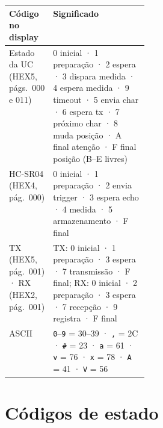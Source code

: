 \documentclass[9pt,a4paper]{extarticle}
\newcommand{\s}[1]{\texttt{#1}}          %
\begin{document}
\begin{center}
\end{center}

\begin{tabularx}{\linewidth}{@{}>{\raggedright\arraybackslash}p{0.27\linewidth} Y@{}}
\toprule
Código no display & Significado \\
\midrule
Estado da UC (HEX5, págs.\ 000 e 011) & 0 inicial · 1 preparação · 2 espera · 3 dispara medida · 4 espera medida · 9 timeout · 5 envia char · 6 espera tx · 7 próximo char · 8 muda posição · A final atenção · F final posição (B--E livres) \\
HC-SR04 (HEX4, pág.\ 000) & 0 inicial · 1 preparação · 2 envia trigger · 3 espera echo · 4 medida · 5 armazenamento · F final \\
TX (HEX5, pág.\ 001) · RX (HEX2, pág.\ 001) & TX: 0 inicial · 1 preparação · 3 espera · 7 transmissão · F final; RX: 0 inicial · 2 preparação · 3 espera · 7 recepção · 9 registra · F final \\
ASCII & \s{0}--\s{9} = 30--39 · \s{,} = 2C · \s{\#} = 23 · \s{a} = 61 · \s{v} = 76 · \s{x} = 78 · \s{A} = 41 · \s{V} = 56 \\
\bottomrule
\end{tabularx}

\clearpage
\section{Códigos de estado}
\end{document}
